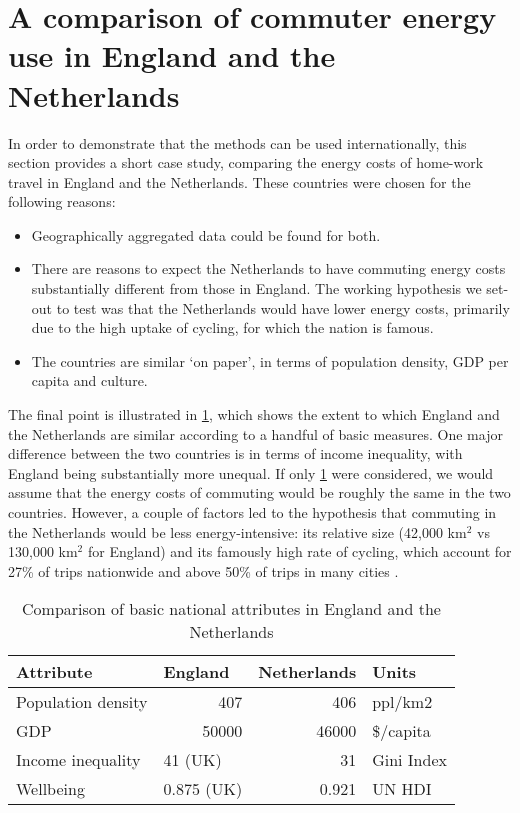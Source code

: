 \section{A comparison of commuter energy use in England and the Netherlands}
\label{sinternational}
In order to demonstrate that the methods can be used internationally,
this section provides a short case study, comparing the energy costs
of home-work travel in England and the Netherlands. These countries
were chosen for the following reasons:
\begin{itemize}
 \item Geographically aggregated data could be found for both.
 \item There are reasons to expect the Netherlands to have commuting energy costs
 substantially different from those in England. The working hypothesis we
 set-out to test was that the Netherlands would have lower energy costs, primarily
 due to the high uptake of cycling, for which the nation is famous.
 \item The countries are similar `on paper', in terms of population density,
 GDP per capita and culture.
\end{itemize}
The final point is illustrated in \cref{tcompare}, which shows the extent to
which England and the Netherlands are similar according to a handful of basic
measures. One major difference between the two countries is in terms of
income inequality, with England being substantially more unequal.
If only \cref{tcompare} were considered, we would assume that the energy
costs of commuting would be roughly the same in the two countries. However,
a couple of factors led to the hypothesis that commuting in the Netherlands
would be less energy-intensive: its relative size (42,000 km$^2$ vs 130,000 km$^2$
for England) and its famously high rate of cycling, which account for
27\% of trips nationwide and above 50\% of trips in many cities \citep{Pucher2008}.

\begin{table}[htbp]
\caption{Comparison of basic national attributes in England and the Netherlands}
\begin{center}
\begin{tabular}{llrl}
\toprule
Attribute & England & \multicolumn{1}{l}{Netherlands } & Units \\
\midrule
Population density & \multicolumn{1}{r}{407} & 406 & ppl/km2 \\
GDP & \multicolumn{1}{r}{50000} & 46000 & \$/capita \\
Income inequality & 41 (UK) & 31 & Gini Index \\
Wellbeing & 0.875 (UK) & 0.921 & UN HDI \\
\bottomrule
\end{tabular}\end{center}
\label{tcompare}
\end{table}

